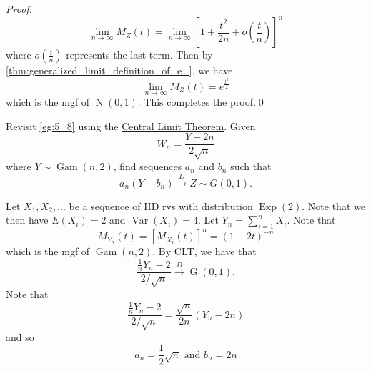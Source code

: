 \documentclass[notoc,notitlepage]{tufte-book}
\DeclareMathOperator{\Exp}{Exp }
\DeclareMathOperator{\Nor}{N }
\DeclareMathOperator{\Gau}{G }
\DeclareMathOperator{\Gam}{Gam }
\DeclareMathOperator{\Var}{Var }
\newcommand{\convd}{\overset{D}{\to}}
\begin{document}
\begin{proof}
  \begin{equation*}
    \lim_{n \to \infty} M_Z (t) = \lim_{n \to \infty} \left[ 1 + \frac{t^2}{2n} + o(\frac{t}{n}) \right]^n
  \end{equation*}
  where $o\left(\frac{t}{n}\right)$ represents the last term. Then by \cref{thm:generalized_limit_definition_of_e_}, we have
  \begin{equation*}
    \lim_{n \to \infty} M_Z(t) = e^{\frac{t^2}{2}}
  \end{equation*}
  which is the mgf of $\Nor(0, 1)$. This completes the proof.\qed
\end{proof}

\begin{eg}[Example 5.9]
  Revisit \cref{eg:5_8} using the \hyperref[thm:central_limit_theorem]{\faCoffee \; Central Limit Theorem}. Given
  \begin{equation*}
    W_n = \frac{Y - 2n}{2 \sqrt{n}}
  \end{equation*}
  where $Y \sim \Gam( n, 2 )$, find sequences $a_n$ and $b_n$ such that
  \begin{equation*}
    a_n ( Y - b_n ) \convd Z \sim G(0, 1).
  \end{equation*}
\end{eg}

\begin{solution}
   Let $X_1, X_2, ...$ be a sequence of IID rvs with distribution $\Exp(2)$. Note that we then have $E(X_i) = 2$ and $\Var(X_i) = 4$. Let $Y_n = \sum_{i=1}^{n} X_i$. Note that
  \begin{equation*}
    M_{Y_n}(t) = [ M_{X_i}(t) ]^n = (1 - 2t)^{-n}
  \end{equation*}
  which is the mgf of $\Gam(n, 2)$. By CLT, we have that
  \begin{equation*}
    \frac{\frac{1}{n} Y_n - 2}{2 / \sqrt{n}} \convd \Gau(0, 1).
  \end{equation*}
  Note that
  \begin{equation*}
    \frac{\frac{1}{n}Y_n - 2}{2 / \sqrt{n}} = \frac{\sqrt{n}}{2 n} ( Y_n - 2n )
  \end{equation*}
  and so
  \begin{equation*}
    a_n = \frac{1}{2}\sqrt{n} \text{ and } b_n = 2n
  \end{equation*}
\end{solution}
\end{document}
